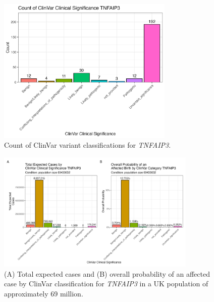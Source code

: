\documentclass[a4paper,12pt]{article}
\begin{document}
\begin{figure}[H]
  \centering
  \includegraphics[width=0.75\textwidth]{../images/tnfaip3_clinvar_count.png}
  \caption{Count of ClinVar variant classifications for \textit{TNFAIP3}.}
  \label{fig:tnfaip3_clinvar_count}
\end{figure}

\begin{figure}[H]
  \centering
  \includegraphics[width=0.85\textwidth]{../images/tnfaip3_combined_bar_charts.png}
  \caption{(A) Total expected cases and (B) overall probability of an affected case by ClinVar classification for \textit{TNFAIP3} in a UK population of approximately 69 million.}
  \label{fig:tnfaip3_combined_bar_charts}
\end{figure}
\end{document}
